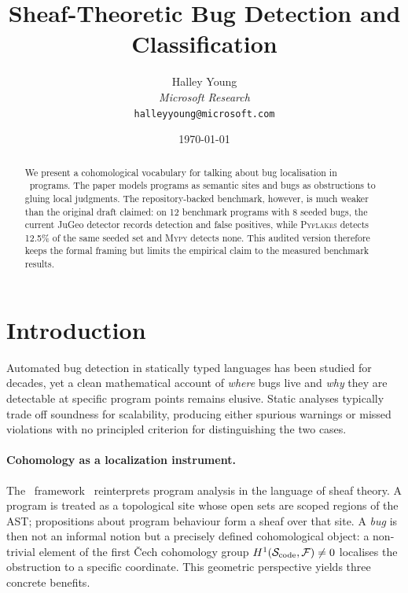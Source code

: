 \documentclass[11pt]{article}
\title{\textbf{Sheaf-Theoretic Bug Detection and Classification}}
\author{%
  Halley Young\\
  \textit{Microsoft Research}\\
  \texttt{halleyyoung@microsoft.com}
}
\date{\today}
\newcommand{\SemSite}{\mathcal{S}_{\mathrm{code}}}%
\begin{document}
\maketitle

\begin{abstract}
We present a cohomological vocabulary for talking about bug localisation in
\Python\ programs.  The paper models programs as semantic sites and bugs as
obstructions to gluing local judgments.  The repository-backed benchmark,
however, is much weaker than the original draft claimed: on 12 benchmark
programs with 8 seeded bugs, the current JuGeo detector records
\subBugDetectionRate{} detection and \subBugFalsePositiveRate{} false
positives, while \textsc{Pyflakes} detects 12.5\% of the same seeded set
and \textsc{Mypy} detects none.  This audited version therefore keeps the
formal framing but limits the empirical claim to the measured benchmark
results.
\end{abstract}

\newpage

\section{Introduction}\label{sec:intro}

Automated bug detection in statically typed languages has been studied for
decades, yet a clean mathematical account of \emph{where} bugs live and
\emph{why} they are detectable at specific program points remains elusive.
Static analyses typically trade off soundness for scalability, producing
either spurious warnings or missed violations with no principled criterion
for distinguishing the two cases.

\paragraph{Cohomology as a localization instrument.}
The \JuGeo\ framework~\cite{JuGeo2023} reinterprets program analysis in
the language of sheaf theory.  A program is treated as a topological site
whose open sets are scoped regions of the AST; propositions about program
behaviour form a sheaf over that site.  A \emph{bug} is then not an
informal notion but a precisely defined cohomological object: a non-trivial
element of the first \v{C}ech cohomology group
$\Hcoh{1}(\SemSite,\mathcal{F}) \neq 0$ localises the obstruction to a
specific coordinate.  This geometric perspective yields three concrete
benefits.
\end{document}
